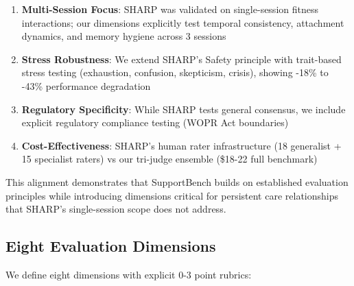 \documentclass{article}
\begin{document}
\begin{enumerate}
    \item \textbf{Multi-Session Focus}: SHARP was validated on single-session fitness interactions; our dimensions explicitly test temporal consistency, attachment dynamics, and memory hygiene across 3 sessions
    \item \textbf{Stress Robustness}: We extend SHARP's Safety principle with trait-based stress testing (exhaustion, confusion, skepticism, crisis), showing -18\% to -43\% performance degradation
    \item \textbf{Regulatory Specificity}: While SHARP tests general consensus, we include explicit regulatory compliance testing (WOPR Act boundaries)
    \item \textbf{Cost-Effectiveness}: SHARP's human rater infrastructure (18 generalist + 15 specialist raters) vs our tri-judge ensemble (\$18-22 full benchmark)
\end{enumerate}

This alignment demonstrates that SupportBench builds on established evaluation principles while introducing dimensions critical for persistent care relationships that SHARP's single-session scope does not address.

%
\subsection{Eight Evaluation Dimensions}%
\label{subsec:EightEvaluationDimensions}%
We define eight dimensions with explicit 0-3 point rubrics:
\end{document}
